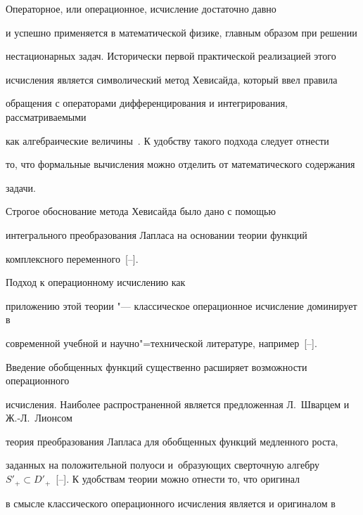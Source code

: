 \renewcommand{\JournalDataOnline}{\displaydate{kogane}}




\makerutitle





 Операторное, или операционное, исчисление достаточно давно 

и успешно применяется в математической физике, главным образом при решении 

нестационарных задач. Исторически первой практической реализацией этого 

исчисления является символический метод Хевисайда, который ввел правила 

обращения с операторами дифференцирования и интегрирования, рассматриваемыми 

как алгебраические величины~\cite{kogan:bib1}. К удобству такого подхода следует отнести 

то, что формальные вычисления можно отделить от математического содержания 

задачи. 



Строгое обоснование метода Хевисайда было дано с помощью 

интегрального преобразования Лапласа на основании теории функций 

комплексного переменного~[--]. 

Подход к операционному исчислению как 

приложению этой теории "--- классическое операционное исчисление доминирует в 

современной учебной и научно"=технической литературе, например~[--]. 



Введение обобщенных функций существенно расширяет возможности операционного 

исчисления. Наиболее распространенной является предложенная  Л.~Шварцем и Ж.-Л.~Лионсом 

теория преобразования Лапласа для обобщенных функций медленного роста, 

заданных на положительной полуоси и~образующих сверточную алгебру $S'_{+} 

\subset D'_{+}$~[--]. К удобствам теории можно отнести то, что оригинал 

в смысле классического операционного исчисления является и оригиналом в 

